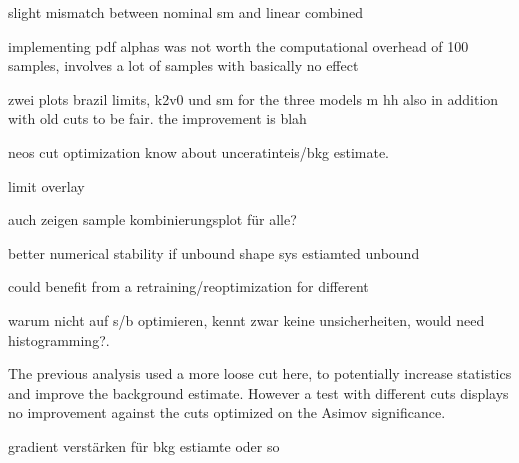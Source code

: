 slight mismatch between nominal sm and linear combined

implementing pdf alphas was not worth the computational overhead of 100 samples, involves a lot of samples with basically no effect

zwei plots brazil limits, k2v0 und sm for the three models
m hh also in addition with old cuts to be fair.
the improvement is blah

neos cut optimization know about unceratinteis/bkg estimate.

limit overlay




auch zeigen sample kombinierungsplot für alle?




better numerical stability if unbound shape sys estiamted unbound


could benefit from a retraining/reoptimization for different \ktwov


warum nicht auf s/b optimieren, kennt zwar keine unsicherheiten, would need histogramming?.


The previous analysis used a more loose cut here, to potentially increase statistics and improve the background estimate. However a test with different cuts displays no improvement against the cuts optimized on the Asimov significance.



gradient verstärken für bkg estiamte oder so